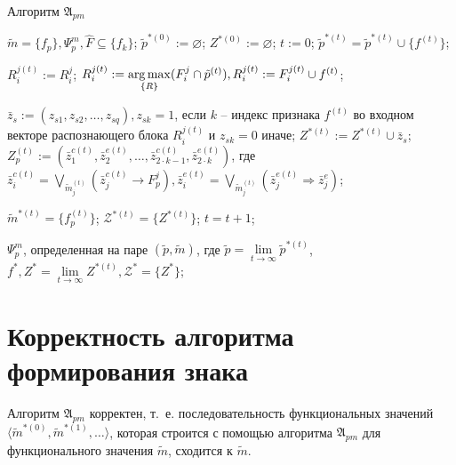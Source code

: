 \begin{algorithm}
	\caption{Алгоритм $\mathfrak{A}_{pm}$}
	\label{alg:cycle_pm}
	\begin{algorithmic}[1]
		\Require $\tilde m=\{f_p\}, \Psi_p^m, \hat F\subseteq \{f_k\}$;
		\State $\tilde p^{*(0)} := \varnothing$;
		\State $Z^{*(0)} := \varnothing$;
		\State $t := 0$;
				\State $\tilde p^{*(t)}=\tilde p^{*(t)}\cup\{f^{(t)}\}$;
				
					\State $R_i^{j(t)}:=R_i^j$;
				\Else
					\State $R_i^{j(t)}:=\operatorname*{arg\,max}\limits_{\{R\}} (F_i^j\cap\tilde p^{(t)}), R_i^{j(t)}:=F_i^{j(t)}\cup f^{(t)}$;
				\EndIf
		
				\State $\bar z_s:=(z_{s1},z_{s2},\dots,z_{sq}), z_{sk}=1$, если $k$ -- индекс признака $f^{(t)}$ во входном векторе распознающего блока $R_i^{j(t)}$ и $z_{sk}=0$ иначе;
				\State $Z^{*(t)}:=Z^{*(t)}\cup\bar z_s$;
				\State $Z_p^{(t)}:=(\bar z_1^{c(t)},\bar z_2^{e(t)},\dots,\bar z_{2\cdot k-1}^{c(t)},\bar z_{2\cdot k}^{e(t)})$, где $\bar z_i^{c(t)}=\bigvee\limits_{\tilde m_j^{(t)}}(\bar z_j^{c(t)}\rightarrow F_p^j), \bar z_i^{e(t)}=\bigvee\limits_{\tilde m_j^{(t)}}(\bar z_j^{e(t)}\Rightarrow\bar z_j^e)$;
			\EndIf
			
			\State $\tilde m^{*(t)}=\{f_p^{(t)}\}$;
			\State $\mathcal Z^{*(t)}=\{Z^{*(t)}\}$;
			\State $t=t+1$;
		\EndFor

		\Return $\Psi_p^m$, определенная на паре $(\tilde p, \tilde m)$, где $\tilde p=\lim\limits_{t\rightarrow\infty}\tilde p^{*(t)}$, $f^*, Z^*=\lim\limits_{t\rightarrow\infty}Z^{*(t)},\mathcal Z^*=\{Z^*\}$;
	\end{algorithmic}
\end{algorithm}


\section{Корректность алгоритма формирования знака} \label{sect3_3}

\begin{Theorem}
	Алгоритм $\mathfrak A_{pm}$ корректен, т.~е. последовательность функциональных значений $\langle\tilde m^{*(0)},\tilde m^{*(1)},\dots\rangle$, которая строится с помощью алгоритма $\mathfrak A_{pm}$ для функционального значения $\tilde m$, сходится к $\tilde m$.
\end{Theorem}

